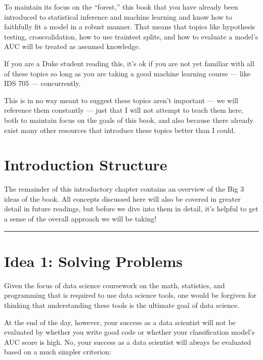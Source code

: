 \documentclass[letterpaper,10pt,english]{jupyterBook}
\begin{document}
\sphinxAtStartPar
To maintain its focus on the “forest,” this book  that you have already been introduced to statistical inference and machine learning and know how to faithfully fit a model in a robust manner. That means that topics like hypothesis testing, cross\sphinxhyphen{}validation, how to use train\sphinxhyphen{}test splits, and how to evaluate a model’s AUC will be treated as assumed knowledge.%
\begin{footnote}[2]\sphinxAtStartFootnote
If you are a Duke student reading this, it’s ok if you are not yet familiar with all of these topics so long as you are taking a good machine learning course — like IDS 705 — concurrently.
%
\end{footnote} This is in no way meant to suggest these topics aren’t important — we will reference them constantly — just that I will not attempt to teach them here, both to maintain focus on the goals of this book, and also because there already exist many other resources that introduce these topics better than I could.


\section{Introduction Structure}
\label{\detokenize{10_introduction/10_solving_problems_with_data:introduction-structure}}
\sphinxAtStartPar
The remainder of this introductory chapter contains an overview of the Big 3 ideas of the book. All concepts discussed here will also be covered in greater detail in future readings, but before we dive into them in detail, it’s helpful to get a sense of the overall approach we will be taking!


\bigskip\hrule\bigskip


\sphinxstepscope


\section{Idea 1: Solving Problems}
\label{\detokenize{10_introduction/20_solving_problems:idea-1-solving-problems}}\label{\detokenize{10_introduction/20_solving_problems::doc}}
\sphinxAtStartPar
Given the focus of data science coursework on the math, statistics, and programming that is required to use data science tools, one would be forgiven for thinking that understanding these tools is the ultimate goal of data science.

\sphinxAtStartPar
At the end of the day, however, your success as a data scientist will not be evaluated by whether you write good code or whether your classification model’s AUC score is high. No, your success as a data scientist will always be evaluated based on a much simpler criterion: 
\end{document}
